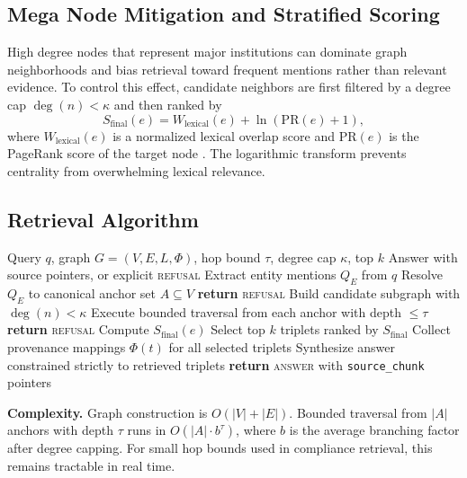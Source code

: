 \documentclass[conference]{IEEEtran}
\begin{document}
\subsection{Mega Node Mitigation and Stratified Scoring}
High degree nodes that represent major institutions can dominate graph neighborhoods and bias retrieval toward frequent mentions rather than relevant evidence. To control this effect, candidate neighbors are first filtered by a degree cap $\deg(n) < \kappa$ and then ranked by
\begin{equation}
  S_{\mathrm{final}}(e)=W_{\mathrm{lexical}}(e)+\ln(\mathrm{PR}(e)+1),
\end{equation}
where $W_{\mathrm{lexical}}(e)$ is a normalized lexical overlap score and $\mathrm{PR}(e)$ is the PageRank score of the target node \cite{angles2018propertygraphs}. The logarithmic transform prevents centrality from overwhelming lexical relevance.

\subsection{Retrieval Algorithm}
\begin{algorithm}[htbp]
  \caption{Deterministic Lexical Structural Retrieval}
  \label{alg:deterministic_retrieval}
  \begin{algorithmic}[1]
    \REQUIRE Query $q$, graph $G=(V,E,L,\Phi)$, hop bound $\tau$, degree cap $\kappa$, top $k$
    \ENSURE Answer with source pointers, or explicit \textsc{refusal}
    \STATE Extract entity mentions $Q_E$ from $q$
    \STATE Resolve $Q_E$ to canonical anchor set $A \subseteq V$
      \STATE \textbf{return} \textsc{refusal}
    \ENDIF
    \STATE Build candidate subgraph with $\deg(n) < \kappa$
    \STATE Execute bounded traversal from each anchor with depth $\leq \tau$
      \STATE \textbf{return} \textsc{refusal}
    \ENDIF
      \STATE Compute $S_{\mathrm{final}}(e)$
    \ENDFOR
    \STATE Select top $k$ triplets ranked by $S_{\mathrm{final}}$
    \STATE Collect provenance mappings $\Phi(t)$ for all selected triplets
    \STATE Synthesize answer constrained strictly to retrieved triplets
    \STATE \textbf{return} \textsc{answer} with \texttt{source\_chunk} pointers
  \end{algorithmic}
\end{algorithm}

\noindent\textbf{Complexity.} Graph construction is $O(|V|+|E|)$. Bounded traversal from $|A|$ anchors with depth $\tau$ runs in $O(|A| \cdot b^{\tau})$, where $b$ is the average branching factor after degree capping. For small hop bounds used in compliance retrieval, this remains tractable in real time.
\end{document}
